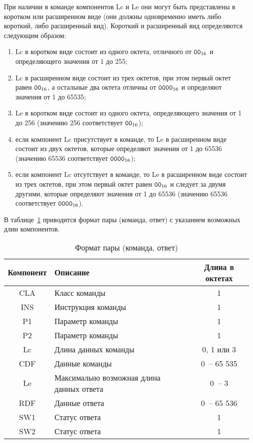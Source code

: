 При наличии в команде компонентов Lc и Le они могут быть представлены 
в коротком или расширенном виде (они должны одновременно иметь либо короткий, 
либо расширенный вид). Короткий и расширенный вид определяются следующим образом: 
\begin{enumerate}
\item[1)]
Lc в коротком виде состоит из одного октета, отличного от $\texttt{00}_{16}$ и 
определяющего значения от 1 до 255; 

\item[2)] 
Lc в расширенном виде состоит из трех октетов, при этом первый октет 
равен $\texttt{00}_{16}$, а остальные два октета отличны от 
$\texttt{0000}_{16}$ и определяют значения от 1 до 65535; 

\item[3)] 
Le в коротком виде состоит из одного октета, определяющего значения 
от 1 до 256 (значению 256 соответствует $\texttt{00}_{16}$); 

\item[4)] 
если компонент Lc присутствует в команде, то Le в расширенном виде 
состоит из двух октетов, которые определяют значения от 1 до 65536 
(значению 65536 соответствует $\texttt{0000}_{16}$); 

\item[5)] 
если компонент Lc отсутствует в команде, то Le в расширенном виде 
состоит из трех октетов, при этом первый октет равен $\texttt{00}_{16}$ и 
следует за двумя другими, которые определяют значения от 1 до 65536 
(значению 65536 соответствует $\texttt{0000}_{16}$). 
\end{enumerate}

В таблице~\ref{Table.CMDS.Fmt} приводится формат пары (команда, ответ) 
с указанием возможных длин компонентов.

\begin{table}[h]
\caption{Формат пары (команда, ответ)}\label{Table.CMDS.Fmt}
\begin{tabular}{|c|p{10.5cm}|c|}
\hline
Компонент & Описание & Длина в октетах \\
\hline
\hline
CLA & Класс команды & 1 \\
\hline
INS & Инструкция команды & 1 \\
\hline
P1 & Параметр команды & 1 \\
\hline
P2 & Параметр команды & 1 \\
\hline
Lc & Длина данных команды & 0, 1 или 3  \\
\hline
CDF & Данные команды & 0~-- 65 535 \\
\hline
Le & Максимально возможная длина данных ответа & 0~-- 3 
\\
\hline
RDF & Данные ответа & 0~-- 65 536 \\
\hline
SW1 & Статус ответа & 1 \\
\hline
SW2 & Статус ответа & 1 \\
\hline
\end{tabular}
\end{table}

